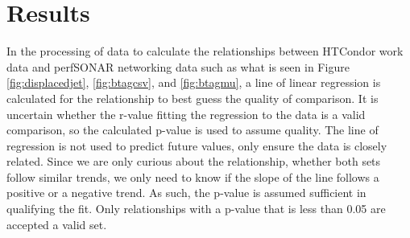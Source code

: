 \documentclass[print,ms]{nuthesis}
\begin{document}
\chapter{Results}
\label{sec:Evaluation}
In the processing of data to calculate the relationships between HTCondor work data and perfSONAR networking data such as what is seen in Figure \ref{fig:displacedjet}, \ref{fig:btagcsv}, and \ref{fig:btagmu}, a line of linear regression is calculated for the relationship to best guess the quality of comparison. It is uncertain whether the r-value fitting the regression to the data is a valid comparison, so the calculated p-value is used to assume quality. The line of regression is not used to predict future values, only ensure the data is closely related. Since we are only curious about the relationship, whether both sets follow similar trends, we only need to know if the slope of the line follows a positive or a negative trend. As such, the p-value is assumed sufficient in qualifying the fit. Only relationships with a p-value that is less than 0.05 are accepted a valid set.
\end{document}
